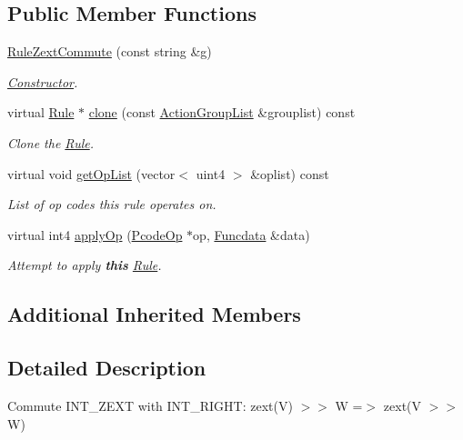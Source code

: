 \subsection*{Public Member Functions}
\begin{DoxyCompactItemize}
\item 
\mbox{\hyperlink{class_rule_zext_commute_a6d4b92a12bec3aa464fe680ea157211f}{Rule\+Zext\+Commute}} (const string \&g)
\begin{DoxyCompactList}\small\item\em \mbox{\hyperlink{class_constructor}{Constructor}}. \end{DoxyCompactList}\item 
virtual \mbox{\hyperlink{class_rule}{Rule}} $\ast$ \mbox{\hyperlink{class_rule_zext_commute_ac52fb507925d6fb14b3138b567dfee6f}{clone}} (const \mbox{\hyperlink{class_action_group_list}{Action\+Group\+List}} \&grouplist) const
\begin{DoxyCompactList}\small\item\em Clone the \mbox{\hyperlink{class_rule}{Rule}}. \end{DoxyCompactList}\item 
virtual void \mbox{\hyperlink{class_rule_zext_commute_aa3f394cbabb17383c580749e0c32d8de}{get\+Op\+List}} (vector$<$ uint4 $>$ \&oplist) const
\begin{DoxyCompactList}\small\item\em List of op codes this rule operates on. \end{DoxyCompactList}\item 
virtual int4 \mbox{\hyperlink{class_rule_zext_commute_a04f5c4f8e6cc15d700d777d55c788e81}{apply\+Op}} (\mbox{\hyperlink{class_pcode_op}{Pcode\+Op}} $\ast$op, \mbox{\hyperlink{class_funcdata}{Funcdata}} \&data)
\begin{DoxyCompactList}\small\item\em Attempt to apply {\bfseries{this}} \mbox{\hyperlink{class_rule}{Rule}}. \end{DoxyCompactList}\end{DoxyCompactItemize}
\subsection*{Additional Inherited Members}


\subsection{Detailed Description}
Commute I\+N\+T\+\_\+\+Z\+E\+XT with I\+N\+T\+\_\+\+R\+I\+G\+HT\+: {\ttfamily zext(\+V) $>$$>$ W =$>$ zext(V $>$$>$ W)} 

